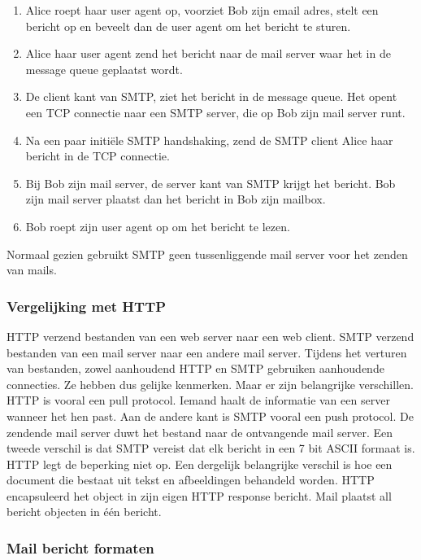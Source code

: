 \begin{enumerate}
 \item Alice roept haar user agent op, voorziet Bob zijn email adres, stelt een bericht op en beveelt dan de user agent om het bericht te sturen.
 \item Alice haar user agent zend het bericht naar de mail server waar het in de message queue geplaatst wordt.
 \item De client kant van SMTP, ziet het bericht in de message queue. Het opent een TCP connectie naar een SMTP server, die op Bob zijn mail server runt.
 \item Na een paar initiële SMTP handshaking, zend de SMTP client Alice haar bericht in de TCP connectie.
 \item Bij Bob zijn mail server, de server kant van SMTP krijgt het bericht. Bob zijn mail server plaatst dan het bericht in Bob zijn mailbox.
 \item Bob roept zijn user agent op om het bericht te lezen.
\end{enumerate}
Normaal gezien gebruikt SMTP geen tussenliggende mail server voor het zenden van mails.

\subsubsection{Vergelijking met HTTP}

HTTP verzend bestanden van een web server naar een web client. SMTP verzend bestanden van een mail server naar een andere mail server. Tijdens het verturen van bestanden, zowel aanhoudend HTTP en SMTP gebruiken aanhoudende connecties. Ze hebben dus gelijke kenmerken. Maar er zijn belangrijke verschillen. HTTP is vooral een pull protocol. Iemand haalt de informatie van een server wanneer het hen past. Aan de andere kant is SMTP vooral een push protocol. De zendende mail server duwt het bestand naar de ontvangende mail server.
Een tweede verschil is dat SMTP vereist dat elk bericht  in een 7 bit ASCII formaat is. HTTP legt de beperking niet op.
Een dergelijk belangrijke verschil is hoe een document die bestaat uit tekst en afbeeldingen behandeld worden. HTTP encapsuleerd het object in zijn eigen HTTP response bericht. Mail plaatst all bericht objecten in één bericht.

\subsubsection{Mail bericht formaten}

